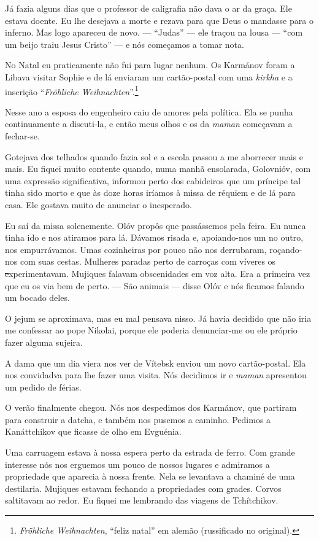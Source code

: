 Já fazia alguns dias que o professor de caligrafia não dava o ar da
graça. Ele estava doente. Eu lhe desejava a morte e rezava para que Deus
o mandasse para o inferno. Mas logo apareceu de novo. --- ``Judas'' ---
ele traçou na lousa --- ``com um beijo traiu Jesus Cristo'' --- e nós
começamos a tomar nota.

No Natal eu praticamente não fui para lugar nenhum. Os Karmánov foram a
Libava visitar Sophie e de lá enviaram um cartão-postal com uma
\emph{kirkha} e a inscrição ``\emph{Fröhliche Weihnachten}''.\footnote{\emph{Fröhliche
  Weihnachten}, ``feliz natal'' em alemão (russificado no original).}

Nesse ano a esposa do engenheiro caiu de amores pela política. Ela se
punha continuamente a discuti-la, e então meus olhos e os da
\emph{maman} começavam a fechar-se.

Gotejava dos telhados quando fazia sol e a escola passou a me aborrecer
mais e mais. Eu fiquei muito contente quando, numa manhã ensolarada,
Golovnióv, com uma expressão significativa, informou perto dos
cabideiros que um príncipe tal tinha sido morto e que às doze horas
iríamos à missa de réquiem e de lá para casa. Ele gostava muito de
anunciar o inesperado.

Eu saí da missa solenemente. Olóv propôs que passássemos pela feira. Eu
nunca tinha ido e nos atiramos para lá. Dávamos risada e, apoiando-nos
um no outro, nos empurrávamos. Umas cozinheiras por pouco não nos
derrubaram, roçando-nos com suas cestas. Mulheres paradas perto de
carroças com víveres os \sout{e}xperimentavam. Mujiques falavam
obscenidades em voz alta. Era a primeira vez que eu os via bem de perto.
--- São animais --- disse Olóv e nós ficamos falando um bocado deles.

O jejum se aproximava, mas eu mal pensava nisso. Já havia decidido que
não iria me confessar ao pope Nikolai, porque ele poderia denunciar-me
ou ele próprio fazer alguma sujeira.

A dama que um dia viera nos ver de Vítebsk enviou um novo cartão-postal.
Ela nos convidadva para lhe fazer uma visita. Nós decidimos ir e
\emph{maman} apresentou um pedido de férias.

O verão finalmente chegou. Nós nos despedimos dos Karmánov, que partiram
para construir a datcha, e também nos pusemos a caminho. Pedimos a
Kanáttchikov que ficasse de olho em Evguénia.

Uma carruagem estava à nossa espera perto da estrada de ferro. Com
grande interesse nós nos erguemos um pouco de nossos lugares e admiramos
a propriedade que aparecia à nossa frente. Nela se levantava a chaminé
de uma destilaria. Mujiques estavam fechando a propriedades com grades.
Corvos saltitavam ao redor. Eu fiquei me lembrando das viagens de
Tchítchikov.

